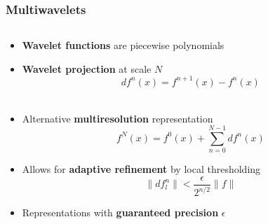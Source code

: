 \begin{frame}
\frametitle{Multiwavelets}
\begin{columns}

\begin{column}[b]{0.55\linewidth}
\begin{itemize}
    \item   \textbf{Wavelet functions} are piecewise polynomials
    \item   \textbf{Wavelet projection} at scale $N$
	\begin{equation}
	    \nonumber
	    df^n(x) = f^{n+1}(x) - f^{n}(x)
	\end{equation}
	\ \\
    \item   Alternative \textbf{multiresolution} representation
	\begin{equation}
	    \nonumber
	    f^N(x) = f^{0}(x) + \sum_{n=0}^{N-1} df^{n}(x)
	\end{equation}
    \item   Allows for \textbf{adaptive refinement} by local thresholding
	\begin{equation}
	    \nonumber
	    \|df_l^n\| < \frac{\epsilon}{2^{n/2}}\|f\|
	\end{equation}
    \item   Representations with \textbf{guaranteed precision} $\epsilon$
\end{itemize}
\ \\
\ \\
\end{column}


\end{columns}
\end{frame}

